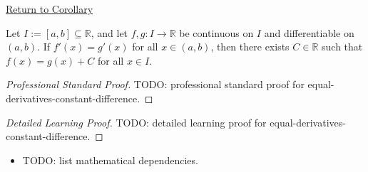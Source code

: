 \newpage
{}
\label{prf:equal-derivatives-constant-difference}

\begin{remark*}[Return]
\hyperref[cor:equal-derivatives-constant-difference]{Return to Corollary}
\end{remark*}

\begin{corollary*}
Let $I := [a,b] \subseteq \mathbb{R}$, and let $f, g : I \to \mathbb{R}$ be continuous on $I$ and differentiable on $(a,b)$. If $f'(x) = g'(x)$ for all $x \in (a,b)$, then there exists $C \in \mathbb{R}$ such that $f(x) = g(x) + C$ for all $x \in I$.
\end{corollary*}

\begin{proof}[Professional Standard Proof]
\LRAProofBodyStart
TODO: professional standard proof for equal-derivatives-constant-difference.
\end{proof}

\begin{proof}[Detailed Learning Proof]
\LRAProofBodyStart
TODO: detailed learning proof for equal-derivatives-constant-difference.
\end{proof}

\begin{remark*}
\end{remark*}

\begin{dependencies}
\begin{itemize}
  \item TODO: list mathematical dependencies.
\end{itemize}
\end{dependencies}

\clearpage
